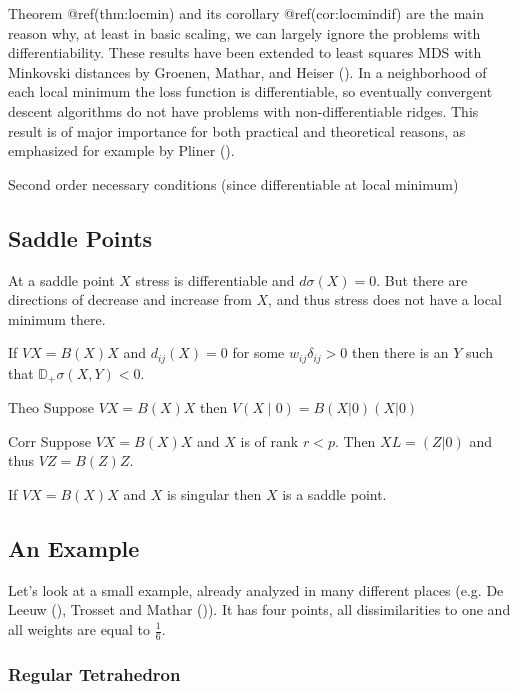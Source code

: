 \documentclass[
  12pt,
  letterpaper,
  DIV=11,
  numbers=noendperiod]{scrreprt}
\theoremstyle{remark}
\begin{document}
Theorem @ref(thm:locmin) and its corollary @ref(cor:locmindif) are the
main reason why, at least in basic scaling, we can largely ignore the
problems with differentiability. These results have been extended to
least squares MDS with Minkovski distances by Groenen, Mathar, and
Heiser (). In a
neighborhood of each local minimum the loss function is differentiable,
so eventually convergent descent algorithms do not have problems with
non-differentiable ridges. This result is of major importance for both
practical and theoretical reasons, as emphasized for example by Pliner
().

Second order necessary conditions (since differentiable at local
minimum)

\subsection{Saddle Points}\label{propsaddle}

At a saddle point \(X\) stress is differentiable and \(d\sigma(X)=0\).
But there are directions of decrease and increase from \(X\), and thus
stress does not have a local minimum there.

If \(VX=B(X)X\) and \(d_{ij}(X)=0\) for some \(w_{ij}\delta_{ij}>0\)
then there is an \(Y\) such that \(\mathbb{D}_+\sigma(X,Y)<0\).

Theo Suppose \(VX=B(X)X\) then \(V(X\mid 0)=B(X|0)(X|0)\)

Corr Suppose \(VX=B(X)X\) and \(X\) is of rank \(r<p\). Then
\(XL=(Z|0)\) and thus \(VZ=B(Z)Z\).

If \(VX=B(X)X\) and \(X\) is singular then \(X\) is a saddle point.

\subsection{An Example}\label{an-example}

Let's look at a small example, already analyzed in many different places
(e.g. De Leeuw (), Trosset and Mathar
()). It has four points, all
dissimilarities to one and all weights are equal to \(\frac16\).

\subsubsection{Regular Tetrahedron}\label{regular-tetrahedron}
\end{document}

